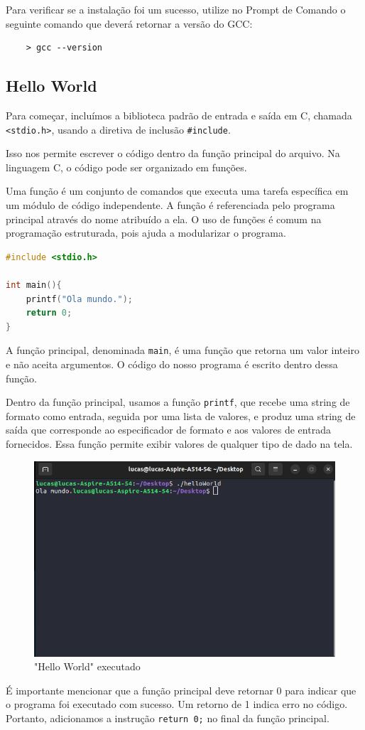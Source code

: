 Para verificar se a instalação foi um sucesso, utilize no Prompt de Comando o seguinte comando que deverá retornar a versão do GCC:

\begin{verbatim}
    > gcc --version
\end{verbatim}

\subsection{Hello World}
Para começar, incluímos a biblioteca padrão de entrada e saída em C, chamada \texttt{<stdio.h>}, usando a diretiva de inclusão \texttt{\#include}.

Isso nos permite escrever o código dentro da função principal do arquivo. Na linguagem C, o código pode ser organizado em funções.

Uma função é um conjunto de comandos que executa uma tarefa específica em um módulo de código independente. A função é referenciada pelo programa principal através do nome atribuído a ela. O uso de funções é comum na programação estruturada, pois ajuda a modularizar o programa.

\begin{lstlisting}[language=C]
#include <stdio.h>

int main(){
    printf("Ola mundo.");
    return 0;
}
\end{lstlisting}

A função principal, denominada \texttt{main}, é uma função que retorna um valor inteiro e não aceita argumentos. O código do nosso programa é escrito dentro dessa função.

Dentro da função principal, usamos a função \texttt{printf}, que recebe uma string de formato como entrada, seguida por uma lista de valores, e produz uma string de saída que corresponde ao especificador de formato e aos valores de entrada fornecidos. Essa função permite exibir valores de qualquer tipo de dado na tela.

\begin{figure}[H]
    \begin{center}
  \includegraphics[width=450px]{imagens/hello_world.png}
  \end{center}
  \caption{"Hello World" executado}
  \label{fig:hello_world}
\end{figure}

É importante mencionar que a função principal deve retornar 0 para indicar que o programa foi executado com sucesso. Um retorno de 1 indica erro no código. Portanto, adicionamos a instrução \texttt{return 0;} no final da função principal.